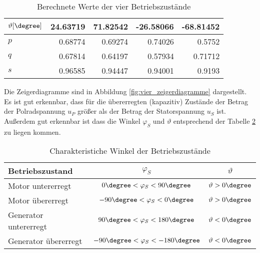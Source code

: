 \begin{table}[!ht]
\begin{tabular}{|l|r|r|r|r|}
    $\vartheta [\degree]$         & 24.63719      & 71.82542       & -26.58066       & -68.81452        \\ \hline
    $p$                           & 0.68774       & 0.69274        & 0.74026         & 0.5752           \\ \hline
    $q$                           & 0.67814       & 0.64197        & 0.57934         & 0.71712          \\ \hline
    $s$                           & 0.96585       & 0.94447        & 0.94001         & 0.9193           \\ \hline
    \end{tabular}
    \caption{Berechnete Werte der vier Betriebszustände}
    \label{tab:berechnete_werte_betrzustaende}
\end{table}
%
Die Zeigerdiagramme sind in Abbildung \ref{fig:vier_zeigerdiagramme} dargestellt. Es ist gut erkennbar, dass für die übererregten (kapazitiv) Zustände der Betrag der Polradspannung $u_P$ größer als der Betrag der Statorspannung $u_S$ ist. Außerdem gut erkennbar ist dass die Winkel $\varphi_S$ und $\vartheta$ entsprechend der Tabelle \ref{tab:charak_winkel_bertzust} zu liegen kommen.

\begin{table}[]
\centering
    \begin{tabular}{|l|c|c|}
    \hline
    \textbf{Betriebszustand}                  & $\varphi_S$                        & $\vartheta$            \\ \hline
    Motor untererregt                         & $0\degree<\varphi_S<90\degree$     & $\vartheta > 0\degree$ \\ \hline
    Motor übererregt                          & $-90\degree<\varphi_S<0\degree$    & $\vartheta > 0\degree$ \\ \hline
    Generator untererregt                     & $90\degree<\varphi_S<180\degree$   & $\vartheta < 0\degree$ \\ \hline
    Generator übererregt                      & $-90\degree<\varphi_S<-180\degree$ & $\vartheta < 0\degree$ \\ \hline
    \end{tabular}
    \caption{Charakteristiche Winkel der Betriebszustände}
    \label{tab:charak_winkel_bertzust}
\end{table}


